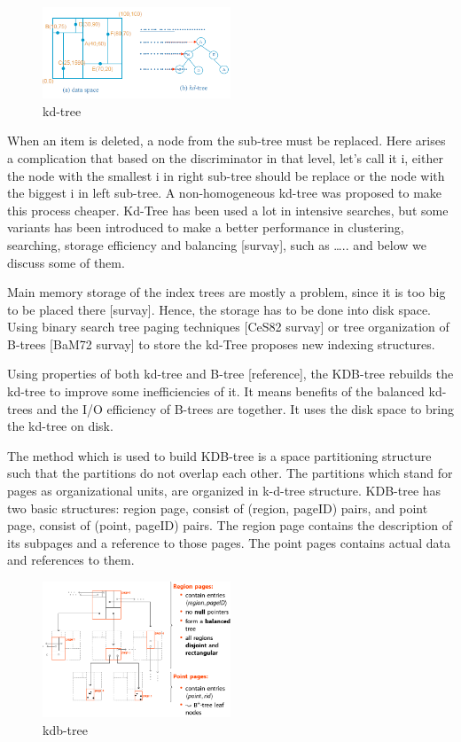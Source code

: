 \documentclass[a4paper,12pt]{article}
\begin{document}
\begin{figure}
\centering
\includegraphics[width=0.5\textwidth]{kdtree}
\caption{kd-tree}
\label{figkdtree}
\end{figure}


When an item is deleted, a node from the sub-tree must be replaced. Here arises a complication that based on the discriminator in that level, let's call it i, either the node with the smallest i in right sub-tree should be replace or  the node with the biggest i in left sub-tree. A non-homogeneous kd-tree was proposed to make this process cheaper. 
Kd-Tree has been used a lot in intensive searches, but some variants has been introduced to make a better performance in clustering, searching, storage efficiency and balancing [survay], such as …..
and below we discuss some of them.

Main memory storage of the index trees are mostly a problem, since it is too big to be placed there  [survay]. Hence, the storage has to be done into disk space. Using binary search tree paging techniques [CeS82 survay] or tree organization of B-trees [BaM72 survay] to store the kd-Tree proposes new indexing structures.

Using properties of both kd-tree and B-tree [reference], the KDB-tree rebuilds the kd-tree to improve some inefficiencies of it.  It means benefits of the balanced kd-trees and the I/O efficiency of B-trees are together. It uses the disk space to bring the kd-tree on disk. 

The method which is used to build  KDB-tree is a space partitioning structure such that the partitions do not overlap each other. The partitions which stand for pages as organizational units, are organized in k-d-tree structure. 
KDB-tree has two basic structures: region page, consist of (region, pageID) pairs, and point page, consist of  (point, pageID) pairs. The region page contains the description of its subpages and a reference to those pages. The point pages contains actual data and references to them. 

\begin{figure}
\centering
\includegraphics[width=0.5\textwidth]{kdbtree}
\caption{kdb-tree}
\label{figkdbtree}
\end{figure}
\end{document}
